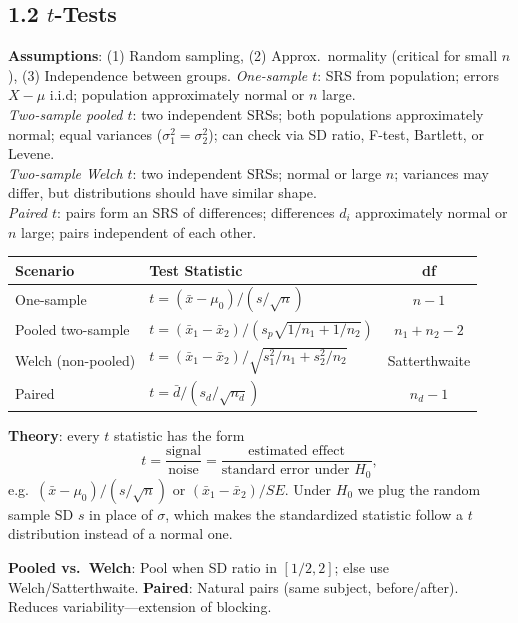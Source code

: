 \documentclass[9pt,letterpaper]{article}
\begin{document}
\subsection{1.2 $t$-Tests}
\textbf{Assumptions}: (1) Random sampling, (2) Approx.\ normality (critical for small $n$), (3) Independence between groups.
\textit{One-sample $t$}: SRS from population; errors $X-\mu$ i.i.d; population approximately normal or $n$ large.\\
\textit{Two-sample pooled $t$}: two independent SRSs; both populations approximately normal; equal variances ($\sigma_1^2=\sigma_2^2$); can check via SD ratio, F-test, Bartlett, or Levene.\\
\textit{Two-sample Welch $t$}: two independent SRSs; normal or large $n$; variances may differ, but distributions should have similar shape.\\
\textit{Paired $t$}: pairs form an SRS of differences; differences $d_i$ approximately normal or $n$ large; pairs independent of each other.


\begin{center}\small
\begin{tabular}{@{}llc@{}}
\toprule
\textbf{Scenario} & \textbf{Test Statistic} & \textbf{df} \\
\midrule
One-sample & $t = (\bar{x} - \mu_0)/(s/\sqrt{n})$ & $n-1$ \\
Pooled two-sample & $t = (\bar{x}_1 - \bar{x}_2)/(s_p\sqrt{1/n_1 + 1/n_2})$ & $n_1+n_2-2$ \\
Welch (non-pooled) & $t = (\bar{x}_1 - \bar{x}_2)/\sqrt{s_1^2/n_1 + s_2^2/n_2}$ & Satterthwaite \\
Paired & $t = \bar{d}/(s_d/\sqrt{n_d})$ & $n_d - 1$ \\
\bottomrule
\end{tabular}
\end{center}

\textbf{Theory}: every $t$ statistic has the form
\[
t = \frac{\text{signal}}{\text{noise}} = \frac{\text{estimated effect}}{\text{standard error under }H_0},
\]
e.g.\ $(\bar{x}-\mu_0)/(s/\sqrt{n})$ or $(\bar{x}_1-\bar{x}_2)/SE$. Under $H_0$ we plug the random sample SD $s$ in place of $\sigma$, which makes the standardized statistic follow a $t$ distribution instead of a normal one.

\textbf{Pooled vs.\ Welch}: Pool when SD ratio in $[1/2, 2]$; else use Welch/Satterthwaite. \textbf{Paired}: Natural pairs (same subject, before/after). Reduces variability---extension of blocking.
\end{document}

